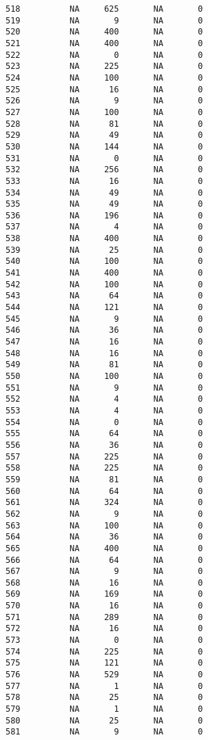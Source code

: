 \documentclass[
  letterpaper,
  DIV=11,
  numbers=noendperiod]{scrreprt}
\begin{document}
\begin{verbatim}
518          NA     625       NA       0
519          NA       9       NA       0
520          NA     400       NA       0
521          NA     400       NA       0
522          NA       0       NA       0
523          NA     225       NA       0
524          NA     100       NA       0
525          NA      16       NA       0
526          NA       9       NA       0
527          NA     100       NA       0
528          NA      81       NA       0
529          NA      49       NA       0
530          NA     144       NA       0
531          NA       0       NA       0
532          NA     256       NA       0
533          NA      16       NA       0
534          NA      49       NA       0
535          NA      49       NA       0
536          NA     196       NA       0
537          NA       4       NA       0
538          NA     400       NA       0
539          NA      25       NA       0
540          NA     100       NA       0
541          NA     400       NA       0
542          NA     100       NA       0
543          NA      64       NA       0
544          NA     121       NA       0
545          NA       9       NA       0
546          NA      36       NA       0
547          NA      16       NA       0
548          NA      16       NA       0
549          NA      81       NA       0
550          NA     100       NA       0
551          NA       9       NA       0
552          NA       4       NA       0
553          NA       4       NA       0
554          NA       0       NA       0
555          NA      64       NA       0
556          NA      36       NA       0
557          NA     225       NA       0
558          NA     225       NA       0
559          NA      81       NA       0
560          NA      64       NA       0
561          NA     324       NA       0
562          NA       9       NA       0
563          NA     100       NA       0
564          NA      36       NA       0
565          NA     400       NA       0
566          NA      64       NA       0
567          NA       9       NA       0
568          NA      16       NA       0
569          NA     169       NA       0
570          NA      16       NA       0
571          NA     289       NA       0
572          NA      16       NA       0
573          NA       0       NA       0
574          NA     225       NA       0
575          NA     121       NA       0
576          NA     529       NA       0
577          NA       1       NA       0
578          NA      25       NA       0
579          NA       1       NA       0
580          NA      25       NA       0
581          NA       9       NA       0

\end{verbatim}
\end{document}
